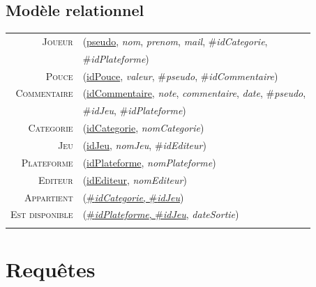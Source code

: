 \documentclass{beamer}
\newenvironment{mld}
{\par\begin{minipage}{\linewidth}\begin{tabular}{rp{\linewidth}}}
{\end{tabular}\end{minipage}\par}
\newcommand{\relat}[1]{\textsc{#1}}
\newcommand{\attr}[1]{\emph{#1}}
\newcommand{\prim}[1]{\uline{#1}}
\newcommand{\foreign}[1]{\#\textsl{#1}}
\begin{document}
\subsection{Modèle relationnel}
\begin{frame}
\begin{center}
\begin{mld}
  \relat{Joueur} & (\prim{pseudo}, \attr{nom}, \attr{prenom}, \attr{mail}, \foreign{idCategorie}, \\ 
  \relat{} & \foreign{idPlateforme})\\
  \relat{Pouce} & (\prim{idPouce}, \attr{valeur}, \foreign{pseudo}, \foreign{idCommentaire})\\
  \relat{Commentaire} & (\prim{idCommentaire}, \attr{note}, \attr{commentaire}, \attr{date}, \foreign{pseudo},\\ 
  \relat{} & \foreign{idJeu}, \foreign{idPlateforme})\\
  \relat{Categorie} & (\prim{idCategorie}, \attr{nomCategorie})\\
  \relat{Jeu} & (\prim{idJeu}, \attr{nomJeu}, \foreign{idEditeur})\\
  \relat{Plateforme} & (\prim{idPlateforme}, \attr{nomPlateforme})\\
  \relat{Editeur} & (\prim{idEditeur}, \attr{nomEditeur})\\
  \relat{Appartient} & (\prim{\foreign{idCategorie}, \foreign{idJeu}})\\
  \relat{Est disponible} & (\prim{\foreign{idPlateforme}, \foreign{idJeu}}, \attr{dateSortie})\\ \\
\end{mld}
\end{center}
\end{frame}

\section{Requêtes}
\end{document}
